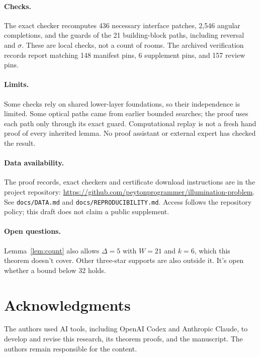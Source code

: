 \documentclass[11pt]{article}
\theoremstyle{remark}
\begin{document}
\paragraph{Checks.} The exact checker recomputes 436 necessary interface patches, 2{,}546 angular completions, and the guards of the 21 building-block paths, including reversal and $\sigma$. These are local checks, not a count of rooms. The archived verification records report matching 148 manifest pins, 6 supplement pins, and 157 review pins.

\paragraph{Limits.} Some checks rely on shared lower-layer foundations, so their independence is limited. Some optical paths came from earlier bounded searches; the proof uses each path only through its exact guard. Computational replay is not a fresh hand proof of every inherited lemma. No proof assistant or external expert has checked the result.

\paragraph{Data availability.} The proof records, exact checkers and certificate download instructions are in the project repository: \url{https://github.com/peytonprogrammer/illumination-problem}. See \texttt{docs/DATA.md} and \texttt{docs/REPRODUCIBILITY.md}. Access follows the repository policy; this draft does not claim a public supplement.

\paragraph{Open questions.} Lemma~\ref{lem:count} also allows $\Delta=5$ with $W=21$ and $k=6$, which this theorem doesn't cover. Other three-star supports are also outside it. It's open whether a bound below 32 holds.

\section*{Acknowledgments}
The authors used AI tools, including OpenAI Codex and Anthropic Claude, to develop and revise this research, its theorem proofs, and the manuscript. The authors remain responsible for the content.
\end{document}
